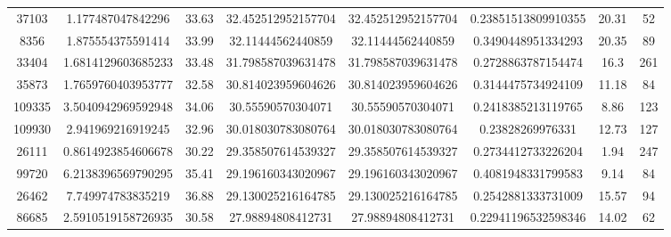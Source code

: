 \documentclass[14pt]{article} %
\begin{document}
\begin{landscape}
\begin{spacing}{1.0}
\begin{table}[h]
\begin{tabular}{|c|c|c|c|c|c|c|c|}
37103&1.177487047842296&33.63&32.452512952157704&32.452512952157704&0.23851513809910355&20.31&52\\
8356&1.875554375591414&33.99&32.11444562440859&32.11444562440859&0.3490448951334293&20.35&89\\
33404&1.6814129603685233&33.48&31.798587039631478&31.798587039631478&0.2728863787154474&16.3&261\\
35873&1.7659760403953777&32.58&30.814023959604626&30.814023959604626&0.3144475734924109&11.18&84\\
109335&3.5040942969592948&34.06&30.55590570304071&30.55590570304071&0.2418385213119765&8.86&123\\
109930&2.941969216919245&32.96&30.018030783080764&30.018030783080764&0.23828269976331&12.73&127\\
26111&0.8614923854606678&30.22&29.358507614539327&29.358507614539327&0.2734412733226204&1.94&247\\
99720&6.2138396569790295&35.41&29.196160343020967&29.196160343020967&0.4081948331799583&9.14&84\\
26462&7.749974783835219&36.88&29.130025216164785&29.130025216164785&0.2542881333731009&15.57&94\\
86685&2.5910519158726935&30.58&27.98894808412731&27.98894808412731&0.22941196532598346&14.02&62\\
\hline 
\end{tabular}
\end{table}

\newpage


\end{spacing}
\end{landscape}
\end{document}
